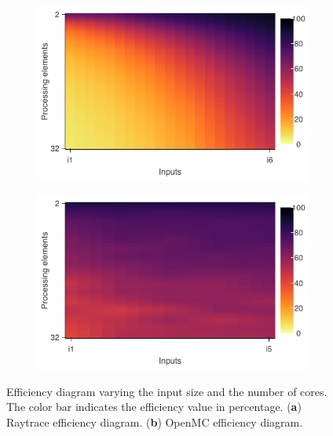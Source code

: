 \begin{figure}[H]
	\begin{subfigure}[b]{0.46\textwidth}
		\includegraphics[width=\textwidth]{pascalanalyzer/figures/results/efficiency_raytrace.png}
		\label{fig:efficiency_raytrace}
	\end{subfigure}
	\begin{subfigure}[b]{0.46\textwidth}
		\includegraphics[width=\textwidth]{pascalanalyzer/figures/results/efficiency_openmc.png}
		\label{fig:efficiency_openmc}
	\end{subfigure}
	
	\caption{Efficiency diagram varying the input size and the number of cores. The color bar indicates the efficiency value in percentage. (\textbf{a}) Raytrace efficiency diagram. (\textbf{b}) OpenMC efficiency diagram.}
	\label{fig:efficiency_all}
\end{figure}

